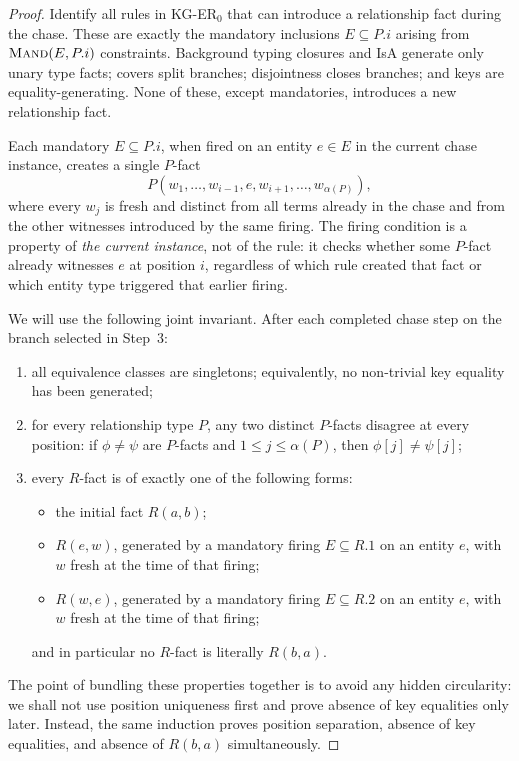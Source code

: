 \documentclass[10pt]{article}
\begin{document}
\begin{proof}
Identify all rules in KG-ER\(_0\) that can introduce a relationship
fact during the chase.  These are exactly the mandatory inclusions
\(E\subseteq P.i\) arising from \(\textsc{Mand}(E,P.i)\) constraints.
Background typing closures and IsA generate only unary type facts;
covers split branches; disjointness closes branches; and keys are
equality-generating.  None of these, except mandatories, introduces a
new relationship fact.

Each mandatory \(E\subseteq P.i\), when fired on an entity \(e\in E\)
in the current chase instance, creates a single \(P\)-fact
\[
P(w_1,\ldots,w_{i-1},e,w_{i+1},\ldots,w_{\alpha(P)}),
\]
where every \(w_j\) is fresh and distinct from all terms already in
the chase and from the other witnesses introduced by the same firing.
The firing condition is a property of \emph{the current instance}, not
of the rule: it checks whether some \(P\)-fact already witnesses
\(e\) at position \(i\), regardless of which rule created that fact
or which entity type triggered that earlier firing.

We will use the following joint invariant.  After each completed
chase step on the branch selected in Step~3:
\begin{enumerate}
\item[(I1)] all equivalence classes are singletons; equivalently, no
non-trivial key equality has been generated;
\item[(I2)] for every relationship type \(P\), any two distinct
\(P\)-facts disagree at every position:
if \(\phi\neq\psi\) are \(P\)-facts and \(1\leq j\leq\alpha(P)\),
then \(\phi[j]\neq\psi[j]\);
\item[(I3)] every \(R\)-fact is of exactly one of the following forms:
\begin{itemize}
\item the initial fact \(R(a,b)\);
\item \(R(e,w)\), generated by a mandatory firing
\(E\subseteq R.1\) on an entity \(e\), with \(w\) fresh at the time
of that firing;
\item \(R(w,e)\), generated by a mandatory firing
\(E\subseteq R.2\) on an entity \(e\), with \(w\) fresh at the time
of that firing;
\end{itemize}
and in particular no \(R\)-fact is literally \(R(b,a)\).
\end{enumerate}

The point of bundling these properties together is to avoid any
hidden circularity: we shall not use position uniqueness first and
prove absence of key equalities only later.  Instead, the same
induction proves position separation, absence of key equalities, and
absence of \(R(b,a)\) simultaneously.


\end{proof}
\end{document}
